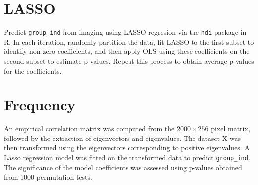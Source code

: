\documentclass[12pt]{article}
\begin{document}
\section*{LASSO}

Predict \texttt{group\_ind} from imaging using LASSO regresion via the \texttt{hdi} package in R. In each iteration, randomly partition the data, fit LASSO to the first subset to identify non-zero coefficients, and then apply OLS using these coefficients on the second subset to estimate p-values. Repeat this process to obtain average p-values for the coefficients.

\section*{Frequency}

An empirical correlation matrix was computed from the \(2000 \times 256\) pixel matrix, followed by the extraction of eigenvectors and eigenvalues. The dataset X was then transformed using the eigenvectors corresponding to positive eigenvalues. A Lasso regression model was fitted on the transformed data to predict \texttt{group\_ind}. The significance of the model coefficients was assessed using p-values obtained from 1000 permutation tests.
\end{document}
